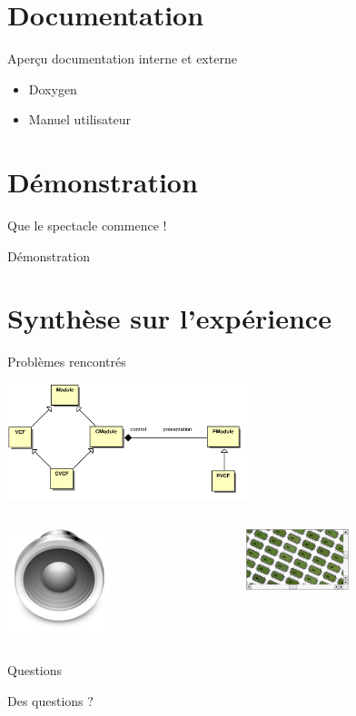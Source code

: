 \documentclass[frenchb]{beamer}
\begin{document}
\section{Documentation}

\begin{frame}{Aperçu documentation interne et externe}
    \begin{itemize}
        \item Doxygen
        \item Manuel utilisateur
    \end{itemize}
\end{frame}

\section{Démonstration}

\begin{frame}{Que le spectacle commence !}
    \begin{center}
        Démonstration
    \end{center}
\end{frame}

\section{Synthèse sur l’expérience}

\begin{frame}{Problèmes rencontrés}
    \begin{center}
        \includegraphics[width=7cm]{../img/ps/pacmodule-psm.pdf}
    \end{center}
    \pause
    \begin{columns}
        \begin{column}[l]{7cm}
        \includegraphics[width=3cm]{../img/png/arts128x128.png}
        \end{column}
        \pause
        \begin{column}[r]{4cm}
        \includegraphics[width=3cm]{../img/png/graphicsview-view.png}
        \end{column}
    \end{columns}
\end{frame}

\begin{frame}{Questions}
    \begin{center}
        Des questions ?
    \end{center}
\end{frame}
\end{document}
